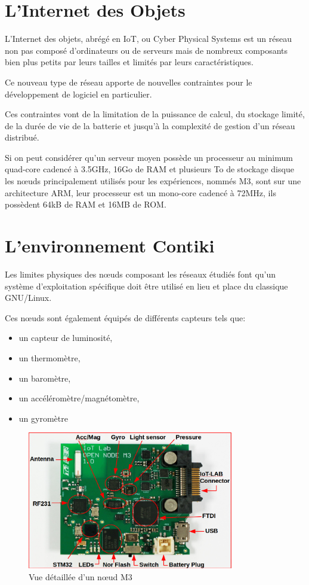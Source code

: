 \section{L'Internet des Objets}

L'Internet des objets, abrégé en IoT, ou Cyber Physical Systems est un réseau non pas composé d'ordinateurs ou de serveurs mais de nombreux composants bien plus petits par leurs tailles et limités par leurs caractéristiques.

Ce nouveau type de réseau apporte de nouvelles contraintes pour le développement de logiciel en particulier.

Ces contraintes vont de la limitation de la puissance de calcul, du stockage limité, de la durée de vie de la batterie et jusqu'à la complexité de gestion d'un réseau distribué.

Si on peut considérer qu'un serveur moyen possède un processeur au minimum quad-core cadencé à 3.5GHz, 16Go de RAM et plusieurs To de stockage disque les nœuds principalement utilisés pour les expériences, nommés M3, sont sur une architecture ARM, leur processeur est un mono-core cadencé à 72MHz, ils possèdent 64kB de RAM et 16MB de ROM.

\section{L'environnement Contiki}

Les limites physiques des nœuds composant les réseaux étudiés font qu'un système d'exploitation spécifique doit être utilisé en lieu et place du classique GNU/Linux.

Ces nœuds sont également équipés de différents capteurs tels que:
\begin{itemize}
\item un capteur de luminosité,
\item un thermomètre,
\item un baromètre,
\item un accéléromètre/magnétomètre,
\item un gyromètre
\end{itemize}

\begin{figure}[ht!]
\centering
\includegraphics[width=90mm]{images/m3opennode.png}
\caption{Vue détaillée d'un nœud M3}
\end{figure}


